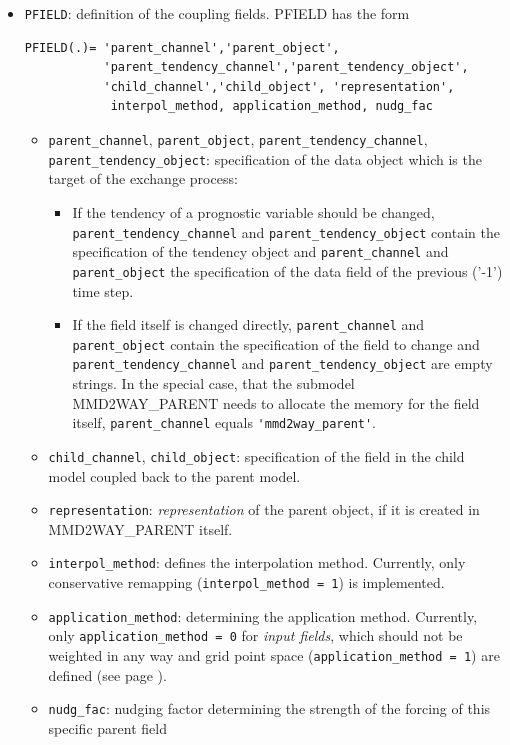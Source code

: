 \documentclass[11pt,twoside]{article}
\begin{document}
\begin{itemize}
\item \verb|PFIELD|: definition of the coupling fields. PFIELD has the form
\begin{verbatim}
PFIELD(.)= 'parent_channel','parent_object',
           'parent_tendency_channel','parent_tendency_object',
           'child_channel','child_object', 'representation',
            interpol_method, application_method, nudg_fac
\end{verbatim}
\begin{itemize}
\item \verb|parent_channel|, \verb|parent_object|, \verb|parent_tendency_channel|, \verb|parent_tendency_object|:
specification of the data object which is the target of the exchange process:
\begin{itemize}
\item If the tendency of a prognostic variable should be
changed, \verb|parent_tendency_channel| and \verb|parent_tendency_object|
contain the specification of the tendency object and \verb|parent_channel|
and \verb|parent_object| the specification of the data field of the previous
('-1') time step.
\item If the field itself is changed directly,  \verb|parent_channel|
and \verb|parent_object| contain the specification of the field to change
and \verb|parent_tendency_channel| and \verb|parent_tendency_object| are empty
strings.
In the special case, that the submodel  MMD2WAY\_PARENT needs to allocate the
memory for the 
field itself, \verb|parent_channel| equals \verb|'mmd2way_parent'|.
\end{itemize}
\item \verb|child_channel|, \verb|child_object|: specification of the field in
the child model coupled back to the parent model.
\item \verb|representation|: {\it representation} of the parent object, if it
is created in MMD2WAY\_PARENT itself.
\item \verb|interpol_method|: defines the interpolation method. Currently,
only conservative remapping (\verb|interpol_method = 1|) is implemented.
\item \verb|application_method|: determining the application method.
 Currently, only \verb|application_method = 0| for {\it input fields},
 which should not be weighted in any way and grid point space
 (\verb|application_method = 1|) are defined (see page \pageref{descript:appl}). 
\item \verb|nudg_fac|: nudging factor determining the strength of the forcing
of this specific parent field

\end{itemize}
\end{itemize}
\end{document}
